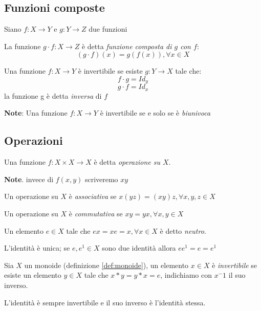         \subsection{Funzioni composte}
            Siano $f: X \rightarrow Y$ e $g: Y \rightarrow Z$ due funzioni
            \begin{definition}
                La funzione $g \cdot f : X \rightarrow Z$ è detta \emph{funzione composta di $g$ con $f$}: $$(g \cdot f)(x) = g(f(x)), \forall x \in X$$
            \end{definition}
            \begin{definition}
                Una funzione $f: X \rightarrow Y$ è invertibile se esiste $g: Y \rightarrow X$ tale che:
                $$f \cdot g = Id_y$$
                $$g\cdot f = Id_x$$
                la funzione g è detta \emph{inversa} di $f$
            \end{definition}
            
            \textbf{Note}: Una funzione $f: X \rightarrow Y$ è invertibile se e solo se è \emph{biunivoca}
            
        \subsection{Operazioni}
            \begin{definition}
                Una funzione $f: X\times X \rightarrow X$ è detta \emph{operazione su $X$}.
            \end{definition}
            \textbf{Note}. invece di $f(x,y)$ scriveremo $xy$
            \begin{definition}[Associatività]
                Un operazione su $X$ è \emph{associativa} se $x(yz) = (xy)z, \forall x,y,z \in X$
            \end{definition}
            \begin{definition}[Commutatività]
                Un operazione su $X$ è \emph{commutativa} se $xy = yx, \forall x,y \in X$
            \end{definition}
            \begin{definition}
                Un elemento $e \in X$ tale che $ex=xe=x, \forall x \in X$ è detto \emph{neutro}.
            \end{definition}
            \begin{corollary}
                L'identità è unica; se $e,e^1 \in X$ sono due identità allora $ee^1=e=e^1$
            \end{corollary}
            \begin{definition}
                Sia $X$ un monoide (definizione \ref{def:monoide}), un elemento $x \in X$ è \emph{invertibile} se esiste un elemento $y \in X$
                tale che $x*y=y*x=e$, indichiamo con $x^-1$ il suo inverso.
            \end{definition}
            \begin{corollary}
                L'identità è sempre invertibile e il suo inverso è l'identità stessa.
            \end{corollary}
    
